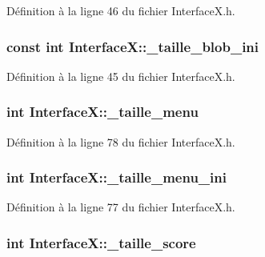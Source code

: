 Définition à la ligne 46 du fichier InterfaceX.h.

\hypertarget{a00011_a88f27d619ba61b4e9105d0be4b1ae474}{
\subsubsection[{\_\-taille\_\-blob\_\-ini}]{\setlength{\rightskip}{0pt plus 5cm}const int {\bf InterfaceX::\_\-taille\_\-blob\_\-ini}}}
\label{a00011_a88f27d619ba61b4e9105d0be4b1ae474}


Définition à la ligne 45 du fichier InterfaceX.h.

\hypertarget{a00011_ac117b8a1db19fc488c6ee2f75badca2b}{
\subsubsection[{\_\-taille\_\-menu}]{\setlength{\rightskip}{0pt plus 5cm}int {\bf InterfaceX::\_\-taille\_\-menu}}}
\label{a00011_ac117b8a1db19fc488c6ee2f75badca2b}


Définition à la ligne 78 du fichier InterfaceX.h.

\hypertarget{a00011_a28bcc53b96a43bf89cff0a7f2ee40b7d}{
\subsubsection[{\_\-taille\_\-menu\_\-ini}]{\setlength{\rightskip}{0pt plus 5cm}int {\bf InterfaceX::\_\-taille\_\-menu\_\-ini}}}
\label{a00011_a28bcc53b96a43bf89cff0a7f2ee40b7d}


Définition à la ligne 77 du fichier InterfaceX.h.

\hypertarget{a00011_acb5639de7ed37f0cc5d9270b1067f57b}{
\subsubsection[{\_\-taille\_\-score}]{\setlength{\rightskip}{0pt plus 5cm}int {\bf InterfaceX::\_\-taille\_\-score}}}
\label{a00011_acb5639de7ed37f0cc5d9270b1067f57b}


